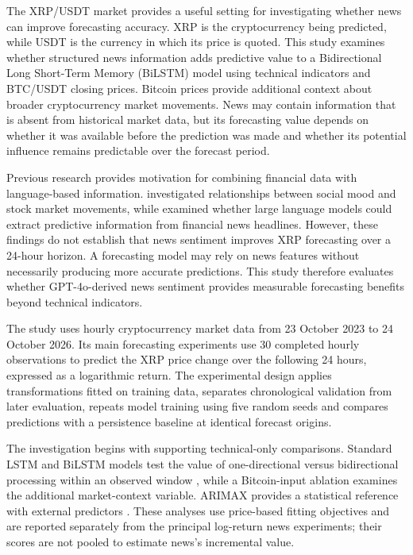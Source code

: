 The XRP/USDT market provides a useful setting for investigating whether news can improve forecasting accuracy. XRP is the cryptocurrency being predicted, while USDT is the currency in which its price is quoted. This study examines whether structured news information adds predictive value to a Bidirectional Long Short-Term Memory (BiLSTM) model using technical indicators and BTC/USDT closing prices. Bitcoin prices provide additional context about broader cryptocurrency market movements. News may contain information that is absent from historical market data, but its forecasting value depends on whether it was available before the prediction was made and whether its potential influence remains predictable over the forecast period.

Previous research provides motivation for combining financial data with language-based information. \citet{Bollen2011} investigated relationships between social mood and stock market movements, while \citet{LopezLira2023} examined whether large language models could extract predictive information from financial news headlines. However, these findings do not establish that news sentiment improves XRP forecasting over a 24-hour horizon. A forecasting model may rely on news features without necessarily producing more accurate predictions. This study therefore evaluates whether GPT-4o-derived news sentiment provides measurable forecasting benefits beyond technical indicators.

The study uses hourly cryptocurrency market data from 23 October 2023 to 24 October 2026. Its main forecasting experiments use 30 completed hourly observations to predict the XRP price change over the following 24 hours, expressed as a logarithmic return. The experimental design applies transformations fitted on training data, separates chronological validation from later evaluation, repeats model training using five random seeds and compares predictions with a persistence baseline at identical forecast origins.

The investigation begins with supporting technical-only comparisons. Standard LSTM and BiLSTM models test the value of one-directional versus bidirectional processing within an observed window \citep{Hochreiter1997,Schuster1997}, while a Bitcoin-input ablation examines the additional market-context variable. ARIMAX provides a statistical reference with external predictors \citep{Hyndman2021,Statsmodels2026}. These analyses use price-based fitting objectives and are reported separately from the principal log-return news experiments; their scores are not pooled to estimate news's incremental value.

